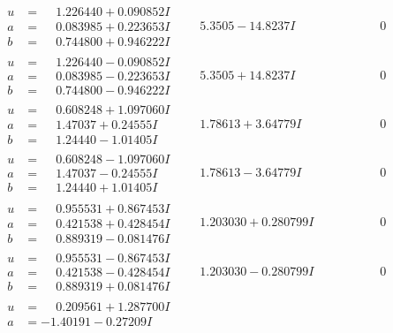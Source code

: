 \documentclass[1p]{elsarticle_modified}
\theoremstyle{definition}
\begin{document}
$$\begin{array}{c|c|c}
\begin{aligned}
u &= \phantom{-}1.226440 + 0.090852 I \\
a &= \phantom{-}0.083985 + 0.223653 I \\
b &= \phantom{-}0.744800 + 0.946222 I\end{aligned}
 & \phantom{-}5.3505 - 14.8237 I & \phantom{-0.000000 } 0 \\ \hline\begin{aligned}
u &= \phantom{-}1.226440 - 0.090852 I \\
a &= \phantom{-}0.083985 - 0.223653 I \\
b &= \phantom{-}0.744800 - 0.946222 I\end{aligned}
 & \phantom{-}5.3505 + 14.8237 I & \phantom{-0.000000 } 0 \\ \hline\begin{aligned}
u &= \phantom{-}0.608248 + 1.097060 I \\
a &= \phantom{-}1.47037 + 0.24555 I \\
b &= \phantom{-}1.24440 - 1.01405 I\end{aligned}
 & \phantom{-}1.78613 + 3.64779 I & \phantom{-0.000000 } 0 \\ \hline\begin{aligned}
u &= \phantom{-}0.608248 - 1.097060 I \\
a &= \phantom{-}1.47037 - 0.24555 I \\
b &= \phantom{-}1.24440 + 1.01405 I\end{aligned}
 & \phantom{-}1.78613 - 3.64779 I & \phantom{-0.000000 } 0 \\ \hline\begin{aligned}
u &= \phantom{-}0.955531 + 0.867453 I \\
a &= \phantom{-}0.421538 + 0.428454 I \\
b &= \phantom{-}0.889319 - 0.081476 I\end{aligned}
 & \phantom{-}1.203030 + 0.280799 I & \phantom{-0.000000 } 0 \\ \hline\begin{aligned}
u &= \phantom{-}0.955531 - 0.867453 I \\
a &= \phantom{-}0.421538 - 0.428454 I \\
b &= \phantom{-}0.889319 + 0.081476 I\end{aligned}
 & \phantom{-}1.203030 - 0.280799 I & \phantom{-0.000000 } 0 \\ \hline\begin{aligned}
u &= \phantom{-}0.209561 + 1.287700 I \\
a &= -1.40191 - 0.27209 I \\

\end{aligned}
\end{array}$$
\end{document}
